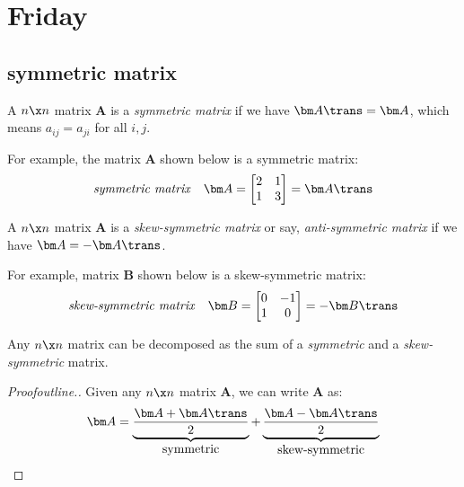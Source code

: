 

\section{Friday}
\subsection{symmetric matrix}
\begin{definition}
A $n\x n$ matrix $\bm A$ is a \emph{symmetric matrix} if we have $\bm A\trans = \bm A$, which means $a_{ij}=a_{ji}$ for all $i,j$.
\end{definition}
For example, the matrix $\bm A$ shown below is a symmetric matrix:
\[
\begin{array}{ll}
\mbox{\emph{symmetric matrix}}
&
\bm A = \begin{bmatrix}
2&1\\1&3
\end{bmatrix}=\bm A\trans
\end{array}
\]
\begin{definition}
A $n\x n$ matrix $\bm A$ is a \emph{skew-symmetric matrix} or say, \emph{anti-symmetric matrix} if we have $\bm A = -\bm A\trans$.
\end{definition}
For example, matrix $\bm B$ shown below is a skew-symmetric matrix:
\[
\begin{array}{ll}
\mbox{\emph{skew-symmetric matrix}}
&
\bm B = \begin{bmatrix}
0&-1\\1&0
\end{bmatrix}=-\bm B\trans
\end{array}
\]
\begin{theorem}
Any $n\x n$ matrix can be decomposed as the sum of a \textit{symmetric} and a \textit{skew-symmetric} matrix.
\end{theorem}
\begin{proof}[Proofoutline.]
Given any $n\x n$ matrix $\bm A$, we can write $\bm A$ as:
\[
\bm A = \underbrace{\frac{\bm A+\bm A\trans}{2}}_{\mbox{symmetric}} + \underbrace{\frac{\bm A-\bm A\trans}{2}}_{\mbox{skew-symmetric}}
\]
\end{proof}
\newpage
